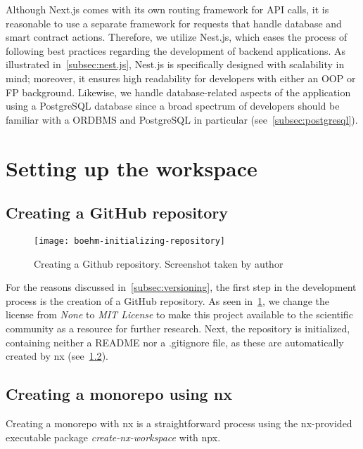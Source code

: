 Although Next.js comes with its own routing framework for API calls, it is reasonable to use a separate framework for requests that handle database and smart contract actions.
Therefore, we utilize Nest.js, which eases the process of following best practices regarding the development of backend applications.
As illustrated in~\cref{subsec:nest.js}, Nest.js is specifically designed with scalability in mind;
moreover, it ensures high readability for developers with either an \gls{OOP} or \gls{FP} background.
Likewise, we handle  database-related aspects of the application using a PostgreSQL database since a broad spectrum of developers should be familiar with a \gls{ORDBMS} and PostgreSQL in particular (see~\cref{subsec:postgresql}).

\section{Setting up the workspace}\label{sec:setting-up-the-workspace}

\subsection{Creating a GitHub repository}\label{subsec:creating-a-git-repository}

\begin{figure}[h]
    \centering
    \texttt{[image: boehm-initializing-repository]}
    \caption[Creating a Github repository]{Creating a Github repository. Screenshot taken by author}
    \label{fig:initializing-repository}
\end{figure}

For the reasons discussed in~\cref{subsec:versioning}, the first step in the development process is the creation of a GitHub repository.
As seen in~\cref{fig:initializing-repository}, we change the license from \emph{None} to \emph{MIT License} to make this project available to the scientific community as a resource for further research.
Next, the repository is initialized, containing neither a README nor a .gitignore file, as these are automatically created by nx (see~\cref{subsec:creating-a-monorepo-using-nx}).

\subsection{Creating a monorepo using nx}\label{subsec:creating-a-monorepo-using-nx}

Creating a monorepo with nx is a straightforward process using the nx-provided executable package \emph{create-nx-workspace} with \gls{npx}.

